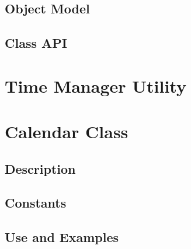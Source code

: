 \documentclass[english]{article}
\begin{document}
\subsection{Object Model}

\subsection{Class API}

\section{Time Manager Utility}




\newpage
\section{Calendar Class}
\subsection{Description}

\subsection{Constants}

\subsection{Use and Examples}


\end{document}
